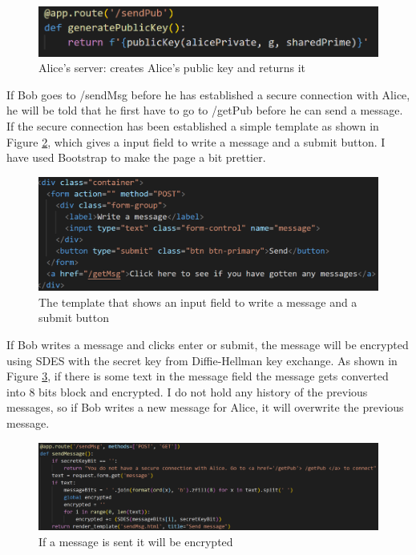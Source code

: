\documentclass[12pt, letterpaper]{article}
\begin{document}
\begin{figure}[H]
  \includegraphics[width=\linewidth]{code_snippets/sendPub.PNG}
  \caption{Alice's server: creates Alice's public key and returns it}
  \label{fig:sendPub}
\end{figure}

If Bob goes to /sendMsg before he has established a secure connection with Alice, he will be told that he first have to go to /getPub before he can send a message. If the secure connection has been established a simple template as shown in Figure \ref{fig:temp}, which gives a input field to write a message and a submit button. I have used Bootstrap to make the page a bit prettier.

\begin{figure}[H]
  \includegraphics[width=\linewidth]{code_snippets/temp.PNG}
  \caption{The template that shows an input field to write a message and a submit button}
  \label{fig:temp}
\end{figure}

If Bob writes a message and clicks enter or submit, the message will be encrypted using SDES with the secret key from Diffie-Hellman key exchange. As shown in Figure \ref{fig:sendMsg}, if there is some text in the message field the message gets converted into 8 bits block and encrypted. I do not hold any history of the previous messages, so if Bob writes a new message for Alice, it will overwrite the previous message.

\begin{figure}[H]
  \hspace*{-50px}\includegraphics[width=500px]{code_snippets/sendMsg.PNG}
  \caption{If a message is sent it will be encrypted}
  \label{fig:sendMsg}
\end{figure}
\end{document}

